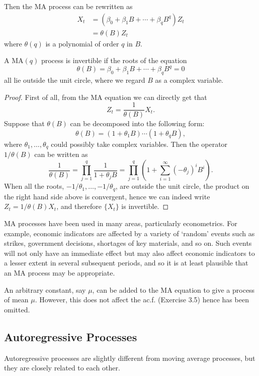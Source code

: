 Then the MA process can be rewritten as 
\begin{align*}
	X_t 
	&= (\beta_0 + \beta_1 B + \cdots + \beta_q B^q) Z_t \\
	&= \theta(B) Z_t
\end{align*}
where $\theta(q)$ is a polynomial of order $q$ in $B$.

\begin{theorem*}
A $\mathrm{MA}(q)$ process is invertible if the roots of the equation 
\[ \theta(B) = \beta_0 + \beta_1 B + \cdots + \beta_q B^q = 0 \]
all lie outside the unit circle, where we regard $B$ as a complex variable.
\end{theorem*}

\begin{proof}
First of all, from the MA equation we can directly get that 
\[ Z_t = \frac{1}{\theta(B)}X_t. \]
Suppose that $\theta(B)$ can be decomposed into the following form:
\[ \theta(B) = (1 + \theta_1 B) \cdots (1 + \theta_q B), \]
where $\theta_1, \dots, \theta_q$ could possibly take complex variables. Then the operator $1 / \theta(B)$ can 
be written as 
\[ \frac{1}{\theta(B)} = \prod_{j = 1}^{q} \frac{1}{1 + \theta_j B} 
= \prod_{j = 1}^{q} \left( 1 + \sum_{i = 1}^{\infty} (-\theta_j)^i B^i \right). \]
When all the roots, $-1/\theta_1, \dots, -1/\theta_q$, are outside the unit circle, the product on the right 
hand side above is convergent, hence we can indeed write $Z_t = 1 / \theta(B) X_t$, and therefore $\{ X_t \}$ 
is invertible.
\end{proof}

MA processes have been used in many areas, particularly econometrics. For example, economic indicators are 
affected by a variety of `random' events such as strikes, government decisions, shortages of key materials, and 
so on. Such events will not only have an immediate effect but may also affect economic indicators to a lesser 
extent in several subsequent periods, and so it is at least plausible that an MA process may be appropriate.

An arbitrary constant, say $\mu$, can be added to the MA equation to give a process of mean $\mu$. However, 
this does not affect the ac.f. (Exercise 3.5) hence has been omitted.



\subsection{Autoregressive Processes}
Autoregressive processes are slightly different from moving average processes, but they are closely related 
to each other.


